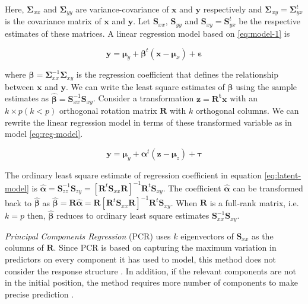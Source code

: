 \documentclass[12pt,3p,authoryear]{elsarticle}
\begin{document}
Here, \(\boldsymbol{\Sigma}_{xx}\) and \(\boldsymbol{\Sigma}_{yy}\) are variance-covariance of \(\mathbf{x}\) and \(\mathbf{y}\) respectively and \(\boldsymbol{\Sigma}_{xy}=\boldsymbol{\Sigma}_{yx}^t\) is the covariance matrix of \(\mathbf{x}\) and \(\mathbf{y}\). Let \(\mathbf{S}_{xx}\), \(\mathbf{S}_{yy}\) and \(\mathbf{S}_{xy}=\mathbf{S}_{yx}^t\) be the respective estimates of these matrices. A linear regression model based on \eqref{eq:model-1} is

\begin{equation}
\mathbf{y} = \boldsymbol{\mu}_y + \boldsymbol{\beta}^t\left( \mathbf{x} - \boldsymbol{\mu}_{x} \right) + \boldsymbol{\varepsilon}
\label{eq:reg-model}
\end{equation}

where \(\boldsymbol{\beta}=\boldsymbol{\Sigma}_{xx}^{-1}\boldsymbol{\Sigma}_{xy}\) is the regression coefficient that defines the relationship between \(\mathbf{x}\) and \(\mathbf{y}\). We can write the least square estimates of \(\boldsymbol{\beta}\) using the sample estimates as \(\boldsymbol{\hat{\beta}}=\mathbf{S}_{xx}^{-1}\mathbf{S}_{xy}\). Consider a transformation \(\mathbf{z}=\mathbf{R^tx}\) with an \(k \times p (k<p)\) orthogonal rotation matrix \(\mathbf{R}\) with \(k\) orthogonal columns. We can rewrite the linear regression model in terms of these transformed variable as in model \eqref{eq:reg-model}.

\begin{equation}
\mathbf{y} = \boldsymbol{\mu}_y + \boldsymbol{\alpha}^t\left( \mathbf{z} - \boldsymbol{\mu}_{z} \right) + \boldsymbol{\tau}
\label{eq:latent-model}
\end{equation}

The ordinary least square estimate of regression coefficient in equation \eqref{eq:latent-model} is \(\boldsymbol{\hat{\alpha}}=\boldsymbol{S}_{zz}^{-1}\boldsymbol{S}_{zy}=\left[\mathbf{R}^t\mathbf{S}_{xx}\mathbf{R}\right]^{-1}\mathbf{R}^t \mathbf{S}_{xy}\). The coefficient \(\boldsymbol{\hat{\alpha}}\) can be transformed back to \(\boldsymbol{\hat{\beta}}\) as \(\boldsymbol{\hat{\beta}}=\mathbf{R}\boldsymbol{\hat{\alpha}}=\mathbf{R}\left[\mathbf{R}^t\mathbf{S}_{xx}\mathbf{R}\right]^{-1}\mathbf{R}^t \mathbf{S}_{xy}\). When \(\mathbf{R}\) is a full-rank matrix, i.e.~\(k=p\) then, \(\boldsymbol{\hat{\beta}}\) reduces to ordinary least square estimates \(\mathbf{S}_{xx}^{-1}\mathbf{S}_{xy}\).

\emph{Principal Components Regression} (PCR) uses \(k\) eigenvectors of \(\mathbf{S}_{xx}\) as the columns of \(\mathbf{R}\). Since PCR is based on capturing the maximum variation in predictors on every component it has used to model, this method does not consider the response structure \citep{Jolliffe2002}. In addition, if the relevant components are not in the initial position, the method requires more number of components to make precise prediction \citep{Alm_y_1996}.
\end{document}
